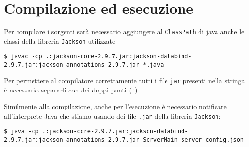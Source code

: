 \section{Compilazione ed esecuzione}
Per compilare i sorgenti sarà necessario aggiungere al \verb|ClassPath| di java anche le classi
della libreria \verb|Jackson| utilizzate:
\begin{lstlisting}
$ javac -cp .:jackson-core-2.9.7.jar:jackson-databind-2.9.7.jar:jackson-annotations-2.9.7.jar *.java
\end{lstlisting}
Per permettere al compilatore correttamente tutti i file \verb|jar| presenti nella stringa è
necessario separarli con dei doppi punti (\verb|:|).

Similmente alla compilazione, anche per l'esecuzione è necessario notificare all'interprete Java
che stiamo usando dei file \verb|.jar| della libreria \verb|Jackson|:
\begin{lstlisting}
$ java -cp .:jackson-core-2.9.7.jar:jackson-databind-2.9.7.jar:jackson-annotations-2.9.7.jar ServerMain server_config.json
\end{lstlisting}